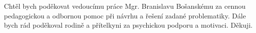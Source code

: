 \startAcknowledgement

Chtěl bych poděkovat vedoucímu práce Mgr. Branislavu Bošanskému za cennou pedagogickou a odbornou pomoc při návrhu a řešení zadané problematiky. Dále bych rád poděkoval rodině a přítelkyni za psychickou podporu a motivaci. Děkuji.

\stopAcknowledgement

\endinput
